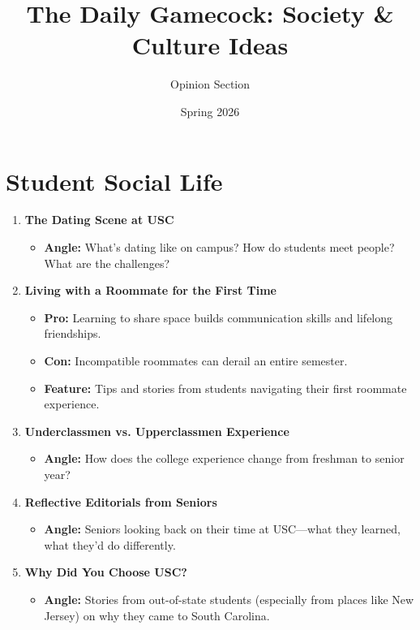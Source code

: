 \documentclass{article}
\title{The Daily Gamecock: Society \& Culture Ideas}
\author{Opinion Section}
\date{Spring 2026}
\begin{document}
\maketitle

\section*{Student Social Life}

\begin{enumerate}[leftmargin=*]
    \item \textbf{The Dating Scene at USC}
    \begin{itemize}
        \item \textbf{Angle:} What's dating like on campus? How do students meet people? What are the challenges?
    \end{itemize}

    \item \textbf{Living with a Roommate for the First Time}
    \begin{itemize}
        \item \textbf{Pro:} Learning to share space builds communication skills and lifelong friendships.
        \item \textbf{Con:} Incompatible roommates can derail an entire semester.
        \item \textbf{Feature:} Tips and stories from students navigating their first roommate experience.
    \end{itemize}

    \item \textbf{Underclassmen vs. Upperclassmen Experience}
    \begin{itemize}
        \item \textbf{Angle:} How does the college experience change from freshman to senior year?
    \end{itemize}

    \item \textbf{Reflective Editorials from Seniors}
    \begin{itemize}
        \item \textbf{Angle:} Seniors looking back on their time at USC---what they learned, what they'd do differently.
    \end{itemize}

    \item \textbf{Why Did You Choose USC?}
    \begin{itemize}
        \item \textbf{Angle:} Stories from out-of-state students (especially from places like New Jersey) on why they came to South Carolina.
    \end{itemize}


\end{enumerate}
\end{document}
